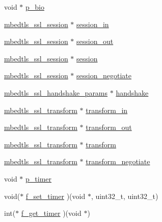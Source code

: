 \begin{DoxyCompactItemize}
\item 
void $\ast$ \hyperlink{structmbedtls__ssl__context_aec081479009cd17997795d6eedf2c641}{p\-\_\-bio}
\item 
\hyperlink{structmbedtls__ssl__session}{mbedtls\-\_\-ssl\-\_\-session} $\ast$ \hyperlink{structmbedtls__ssl__context_a1a54dc6c582580371e94af230077dec1}{session\-\_\-in}
\item 
\hyperlink{structmbedtls__ssl__session}{mbedtls\-\_\-ssl\-\_\-session} $\ast$ \hyperlink{structmbedtls__ssl__context_a9009145707b10147eb41df26eca9629c}{session\-\_\-out}
\item 
\hyperlink{structmbedtls__ssl__session}{mbedtls\-\_\-ssl\-\_\-session} $\ast$ \hyperlink{structmbedtls__ssl__context_a2fc6ea9a1b644ee70bada085f89e3746}{session}
\item 
\hyperlink{structmbedtls__ssl__session}{mbedtls\-\_\-ssl\-\_\-session} $\ast$ \hyperlink{structmbedtls__ssl__context_a73ef7682bfa0827d71b5788c5724e718}{session\-\_\-negotiate}
\item 
\hyperlink{structmbedtls__ssl__handshake__params}{mbedtls\-\_\-ssl\-\_\-handshake\-\_\-params} $\ast$ \hyperlink{structmbedtls__ssl__context_aca0569b7d5c02f79c47fdc964dcc7309}{handshake}
\item 
\hyperlink{structmbedtls__ssl__transform}{mbedtls\-\_\-ssl\-\_\-transform} $\ast$ \hyperlink{structmbedtls__ssl__context_ac7ca7e3d2ee75a1d38f6dc8014c789d1}{transform\-\_\-in}
\item 
\hyperlink{structmbedtls__ssl__transform}{mbedtls\-\_\-ssl\-\_\-transform} $\ast$ \hyperlink{structmbedtls__ssl__context_a06e77983fa7ce4de0ffcd9ae8a038cdf}{transform\-\_\-out}
\item 
\hyperlink{structmbedtls__ssl__transform}{mbedtls\-\_\-ssl\-\_\-transform} $\ast$ \hyperlink{structmbedtls__ssl__context_a501f615c5b6da6b21f666e913e96f343}{transform}
\item 
\hyperlink{structmbedtls__ssl__transform}{mbedtls\-\_\-ssl\-\_\-transform} $\ast$ \hyperlink{structmbedtls__ssl__context_adce09e981f24eb615a5450194750deb7}{transform\-\_\-negotiate}
\item 
void $\ast$ \hyperlink{structmbedtls__ssl__context_ae6aa3c32c60b630754aa03c6aab6a1b7}{p\-\_\-timer}
\item 
void($\ast$ \hyperlink{structmbedtls__ssl__context_a206faf1d8f390868f68e7166f982dad6}{f\-\_\-set\-\_\-timer} )(void $\ast$, uint32\-\_\-t, uint32\-\_\-t)
\item 
int($\ast$ \hyperlink{structmbedtls__ssl__context_ad7059d547158119e81e09dd731081b12}{f\-\_\-get\-\_\-timer} )(void $\ast$)

\end{DoxyCompactItemize}
